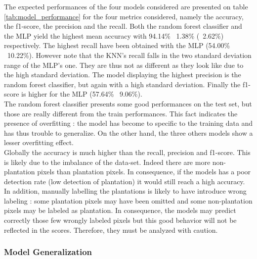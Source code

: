 \documentclass[a4paper, 12pt]{article}
\begin{document}
            The expected performances of the four models considered are presented on table \ref{tab:model_performance} for the four metrics considered, namely the accuracy, the f1-score, the precision and the recall. Both the random forest classifier and the MLP yield the highest mean accuracy with 94.14\% \textpm \ 1.38\% (\textpm \ 2.62\%) respectively. The highest recall have been obtained with the MLP (54.00\% \textpm \ 10.22\%). However note that the KNN's recall falls in the two standard deviation range of the MLP's one. They are thus not as different as they look like due to the high standard deviation. The model displaying the highest precision is the random forest classifier, but again with a high standard deviation. Finally the f1-score is higher for the MLP (57.64\% \textpm \ 9.06\%). \\
            The random forest classifier presents some good performances on the test set, but those are really different from the train performances. This fact indicates the presence of overfitting : the model has become to specific to the training data and has thus trouble to generalize. On the other hand, the three others models show a lesser overfitting effect. \\
            Globally the accuracy is much higher than the recall, precision and f1-score. This is likely due to the imbalance of the data-set. Indeed there are more non-plantation pixels than plantation pixels. In consequence, if the models has a poor detection rate (low detection of plantation) it would still reach a high accuracy. In addition, manually labelling the plantations is likely to have introduce wrong labeling : some plantation pixels may have been omitted and some non-plantation pixels may be labeled as plantation. In consequence, the models may predict correctly those few wrongly labeled pixels but this good behavior will not be reflected in the scores. Therefore, they must be analyzed with caution.

        \subsubsection{Model Generalization}
\end{document}
